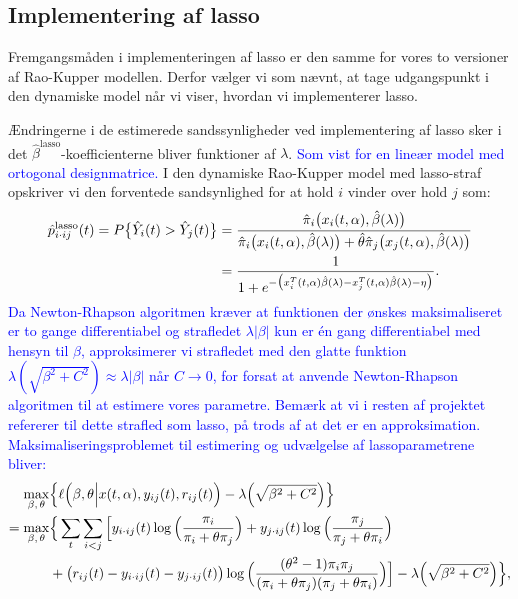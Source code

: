 \documentclass[11pt,a4paper]{article}
\begin{document}
\subsection{Implementering af lasso}
Fremgangsmåden i implementeringen af lasso er den samme for vores to versioner af Rao-Kupper modellen. Derfor vælger vi som nævnt, at tage udgangspunkt i den dynamiske model når vi viser, hvordan vi implementerer lasso. \par
Ændringerne i de estimerede sandssynligheder ved implementering af lasso sker i det $\hat{\beta}^{\text{lasso}}$-koefficienterne bliver funktioner af $\lambda$. \textcolor{blue}{Som vist for en lineær model med ortogonal designmatrice.} I den dynamiske Rao-Kupper model med lasso-straf opskriver vi den forventede sandsynlighed for at hold $i$ vinder over hold $j$ som:
\begin{align}
    \hat{p}^{\text{lasso}}_{i\cdot ij}(t)=P\big{\{}\hat{Y}_{i}(t)>\hat{Y}_{j}(t)\big{\}}
    &=\frac{\hat{\pi}_i\big{(}x_i(t,\alpha),\hat{\beta}(\lambda)\big{)}}{\hat{\pi}_i\big{(}x_i(t,\alpha),\hat{\beta}(\lambda)\big{)}+\hat{\theta}\hat{\pi}_j\big{(}x_j(t,\alpha),\hat{\beta}(\lambda)\big{)}}\\
    &=\frac{1}{1+e^{-\big{(}x_i^T(t,\alpha)\hat{\beta}(\lambda)-x_j^T(t,\alpha)\hat{\beta}(\lambda)-\eta\big{)}}}.
    \label{func:pdynlasso}
\end{align}
\textcolor{blue}{Da Newton-Rhapson algoritmen kræver at funktionen der ønskes maksimaliseret er to gange differentiabel og strafledet $\lambda |\beta|$ kun er én gang differentiabel med hensyn til $\beta$, approksimerer vi strafledet med den glatte funktion $\lambda(\sqrt{\beta^2+C^2})\approx\lambda |\beta|$ når $C\rightarrow 0$, for forsat at anvende Newton-Rhapson algoritmen til at estimere vores parametre. Bemærk at vi i resten af projektet refererer til dette strafled som lasso, på trods af at det er en approksimation. Maksimaliseringsproblemet til estimering og udvælgelse af lassoparametrene bliver:}
\begin{align*}
\max_{\beta,\,\theta} &\Big{\{}\ell\Big{(}\beta,\theta\Big{|}x(t,\alpha),y_{ij}(t),r_{ij}(t)\Big{)}-\lambda \Big{(}\sqrt{\beta^2+C^2}\Big{)}\Big{\}}\\
=\max_{\beta,\,\theta} 
&\Big{\{}\sum_{t}\sum_{i<j}\Big{[}y_{i\cdot ij}(t)\log\Big{(}\frac{\pi_i}{\pi_i+\theta\pi_j}\Big{)}
+ y_{j\cdot ij}(t)\log\Big{(}\frac{\pi_j}{\pi_j+\theta\pi_i}\Big{)}\\
&+ \big{(}r_{ij}(t)-y_{i\cdot ij}(t)-y_{j\cdot ij}(t)\big{)} \log\Big{(}\frac{(\theta^2-1)\pi_i \pi_j}{(\pi_i+\theta\pi_j)(\pi_j+\theta\pi_i)}\Big{)}\Big{]}-\lambda \Big{(}\sqrt{\beta^2+C^2}\Big{)}\Big{\}},
\end{align*}
\end{document}
